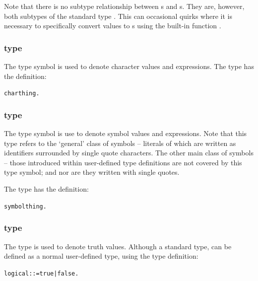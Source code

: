 \begin{aside}
  Note that there is no subtype relationship between s and s. They are, however, both subtypes of the standard type .  This can occasional quirks where it is necessary to specifically convert  values to s using the built-in function .
\end{aside}

\subsubsection{ type}
\label{types:standard:char}

The  type symbol is used to denote character values and expressions. The  type has the definition:
\begin{alltt}
char \impl thing.
\end{alltt}

\subsubsection{ type}
\label{types:standard:symbol}

The  type symbol is use to denote symbol values and expressions. Note that this type refers to the `general' class of symbols -- literals of which are written as identifiers surrounded by single quote characters. The other main class of symbols -- those introduced within user-defined type definitions are not covered by this type symbol; and nor are they written with single quotes.

The  type has the definition:
\begin{alltt}
symbol \impl thing.
\end{alltt}


\subsubsection{ type}
\label{types:standard:logical}

The  type is used to denote truth values. Although a standard type,  can be defined as a normal user-defined type, using the type definition:
\begin{alltt}
logical ::= true | false.
\end{alltt}

